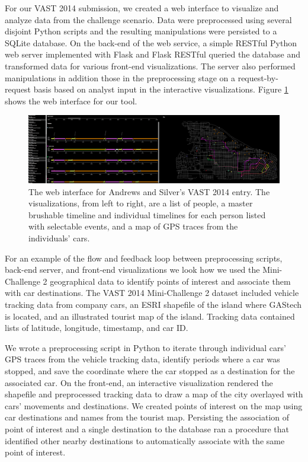 \documentclass[midd]{thesis}
\begin{document}
For our VAST 2014 submission, we created a web interface to visualize and
analyze data from the challenge scenario. Data were preprocessed using several
disjoint Python scripts and the resulting manipulations were persisted to a
SQLite database. On the back-end of the web service, a simple RESTful Python web
server implemented with Flask \cite{flask} and Flask RESTful
\cite{flask-restful} queried the database and transformed data for various
front-end visualizations. The server also performed manipulations in addition
those in the preprocessing stage on a request-by-request basis based on analyst
input in the interactive visualizations. Figure \ref{fig:vast2014} shows the web
interface for our tool.

\begin{figure}[!ht]
  \centering
  \includegraphics[width=1\textwidth]{vast-mc2-2014-cropped-scaled}
  \caption{The web interface for Andrews and Silver's VAST 2014 entry. The
  visualizations, from left to right, are a list of people, a master brushable
  timeline and individual timelines for each person listed with selectable
  events, and a map of GPS traces from the individuals' cars.}
  \label{fig:vast2014}
\end{figure}

For an example of the flow and feedback loop between preprocessing scripts,
back-end server, and front-end visualizations we look how we used the
Mini-Challenge 2 geographical data to identify points of interest and associate
them with car destinations. The VAST 2014 Mini-Challenge 2 dataset included
vehicle tracking data from company cars, an ESRI shapefile of the island where
GAStech is located, and an illustrated tourist map of the island. Tracking data
contained lists of latitude, longitude, timestamp, and car ID.

We wrote a preprocessing script in Python to iterate through individual
cars' GPS traces from the vehicle tracking data, identify periods where a car
was stopped, and save the coordinate where the car stopped as a destination for
the associated car. On the front-end, an interactive visualization rendered the
shapefile and preprocessed tracking data to draw a map of the city overlayed
with cars' movements and destinations. We created points of interest on the map
using car destinations and names from the tourist map. Persisting the
association of point of interest and a single destination to the database ran a
procedure that identified other nearby destinations to automatically associate
with the same point of interest.
\end{document}
